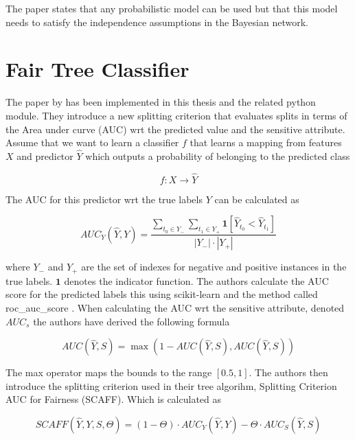 The paper states that any probabilistic model can be used but that this model needs to satisfy the independence assumptions in the Bayesian network.

\section{Fair Tree Classifier}
\label{sec:fairtree}

The paper by \citet{Antonio:2021:arXiv} has been implemented in this thesis and the related python module. They introduce a new splitting criterion that evaluates splits in terms of the Area under curve (AUC) wrt the predicted value and the sensitive attribute. Assume that we want to learn a classifier $f$ that learns a mapping from features $X$ and predictor $\hat{Y}$ which outputs a probability of belonging to the predicted class

$$
f: X \rightarrow \hat{Y}
$$

The AUC for this predictor wrt the true labels $Y$ can be calculated as

\begin{equation*}
    AUC_Y(\hat{Y}, Y) =  \frac
    {
        \sum_{t_0 \in Y_{-}} \sum_{t_1 \in Y_{+}}  \textbf{1}[\hat{Y}_{t_0} < \hat{Y}_{t_1}]
    }
    {
        |Y_{-}| \cdot |Y_{+}|
    }
\end{equation*}

where $Y_-$ and $Y_+$ are the set of indexes for negative and positive instances in the true labels. $\textbf{1}$ denotes the indicator function. The authors calculate the AUC score for the predicted labels this using scikit-learn \cite{Pedregosa:2011:JMLR} and the method called roc\_auc\_score \cite{Buitinck:2013:PKDD}. When calculating the AUC wrt the sensitive attribute, denoted $AUC_s$ the authors have derived the following formula

\begin{equation}
    AUC(\hat{Y}, S) = \max(1 - AUC(\hat{Y}, S), AUC(\hat{Y}, S))
\end{equation}

The max operator maps the bounds to the range $[0.5, 1]$. The authors then introduce the splitting criterion used in their tree algorihm, Splitting Criterion AUC for Fairness (SCAFF). Which is calculated as

\begin{equation*}
    SCAFF(\hat{Y}, Y, S, \Theta) = (1 - \Theta) \cdot AUC_Y(\hat{Y}, Y) - \Theta \cdot AUC_S(\hat{Y}, S)
\end{equation*}

